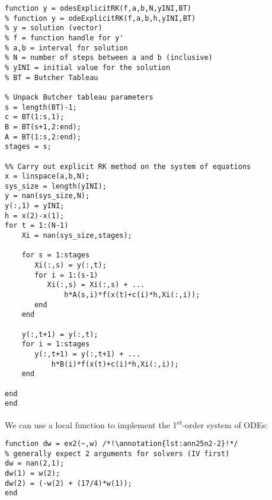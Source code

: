 \begin{lstlisting}[style=myMatlab,name=lec25n-5]
function y = odesExplicitRK(f,a,b,N,yINI,BT)
% function y = odeExplicitRK(f,a,b,h,yINI,BT)
% y = solution (vector)
% f = function handle for y'
% a,b = interval for solution
% N = number of steps between a and b (inclusive)
% yINI = initial value for the solution
% BT = Butcher Tableau

% Unpack Butcher tableau parameters
s = length(BT)-1;
c = BT(1:s,1);
B = BT(s+1,2:end);
A = BT(1:s,2:end);
stages = s;

%% Carry out explicit RK method on the system of equations
x = linspace(a,b,N);
sys_size = length(yINI);
y = nan(sys_size,N);
y(:,1) = yINI;
h = x(2)-x(1);
for t = 1:(N-1)
    Xi = nan(sys_size,stages);
    
    for s = 1:stages
       Xi(:,s) = y(:,t);
       for i = 1:(s-1)
          Xi(:,s) = Xi(:,s) + ...
              h*A(s,i)*f(x(t)+c(i)*h,Xi(:,i)); 
       end
    end
    
    y(:,t+1) = y(:,t);
    for i = 1:stages
       y(:,t+1) = y(:,t+1) + ...
           h*B(i)*f(x(t)+c(i)*h,Xi(:,i)); 
    end
    
end
end
\end{lstlisting}

\noindent We can use a local function to implement the 1\textsuperscript{st}-order system of ODEs:
\begin{lstlisting}[style=myMatlab,name=lec25n-6]
function dw = ex2(~,w) /*!\annotation{lst:ann25n2-2}!*/
% generally expect 2 arguments for solvers (IV first)
dw = nan(2,1);
dw(1) = w(2);
dw(2) = (-w(2) + (17/4)*w(1));
end
\end{lstlisting}

